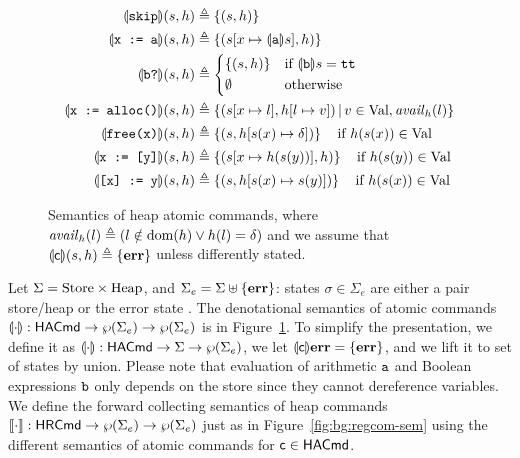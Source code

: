\begin{figure}[t]
	\centering
	\begin{align*}
		\edenot{\code{skip}} (s, h)         & \eqdef \{ (s, h) \}                                                                                      \\
		\edenot{\code{x := a}} (s, h)       & \eqdef \left\lbrace (s[x \mapsto \edenot{\code{a}} s], h) \right\rbrace                                  \\
		\edenot{\code{b?}} (s, h)           & \eqdef \begin{cases*}
			                                             \left\lbrace (s, h) \right\rbrace & if $\edenot{\code{b}} s = \code{tt}$ \\
			                                             \emptyset                         & otherwise
		                                             \end{cases*}      \\
		\edenot{\code{x := alloc()}} (s, h) & \eqdef \left\lbrace (s[x \mapsto l], h[l \mapsto v]) \svert v \in \Val, \mathit{avail}_h(l)\right\rbrace \\
		\edenot{\code{free(x)}} (s, h)      & \eqdef
		\left\lbrace (s, h[s(x) \mapsto \delta]) \right\rbrace\quad \text{if}~h(s(x)) \in \Val                                                         \\
		\edenot{\code{x := [y]}} (s, h)     & \eqdef
		\left\lbrace (s[x \mapsto h(s(y))], h) \right\rbrace\quad \text{if}~h(s(y)) \in \Val                                                           \\
		\edenot{\code{[x] := y}} (s, h)     & \eqdef
		\left\lbrace (s, h[s(x) \mapsto s(y)]) \right\rbrace \quad \text{if}~h(s(x)) \in \Val
	\end{align*}
	\caption{Semantics of heap atomic commands, where $\mathit{avail}_h(l) \triangleq (l \notin \text{dom}(h) \lor h(l) = \delta)$ and we assume that $\llparenthesis\mathsf{c}\rrparenthesis (s, h)\triangleq \left\lbrace \textbf{err} \right\rbrace$ unless differently stated.}
	\label{fig:sil:ssil-model-commands}
\end{figure}

Let $\Sigma = \text{Store} \times \text{Heap}$, and $\Sigma_e = \Sigma \uplus \{ \textbf{err} \}$: states $\sigma \in \Sigma_e$ are either a pair store/heap or the error state \errstate{}.
The denotational semantics of atomic commands $\llparenthesis\cdot\rrparenthesis: \mathsf{HACmd} \rightarrow \wp(\Sigma_e) \rightarrow \wp(\Sigma_e)$ is in Figure~\ref{fig:sil:ssil-model-commands}. To simplify the presentation, we define it as $\llparenthesis\cdot\rrparenthesis: \mathsf{HACmd} \rightarrow \Sigma \rightarrow \wp(\Sigma_e)$, we let $\llparenthesis\mathsf{c}\rrparenthesis \textbf{err} = \{ \textbf{err} \}$, and we lift it to set of states by union.
Please note that evaluation of arithmetic $\texttt{a}$ and Boolean expressions $\texttt{b}$ only depends on the store since they cannot dereference variables.
We define the forward collecting semantics of heap commands $\llbracket\cdot\rrbracket: \mathsf{HRCmd} \rightarrow \wp(\Sigma_e) \rightarrow \wp(\Sigma_e)$ just as in Figure~\ref{fig:bg:regcom-sem} using the different semantics of atomic commands for $\mathsf{c} \in \mathsf{HACmd}$.

